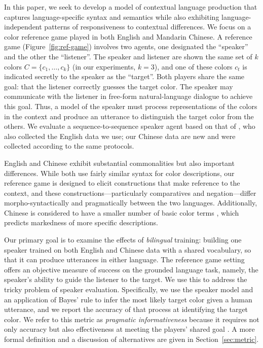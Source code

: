 \documentclass[11pt,a4paper]{article}
\renewcommand{\|}{\mid}
\newcommand{\figref}[1]{Figure~\ref{#1}}
\newcommand{\secref}[1]{Section~\ref{#1}}
\begin{document}
In this paper, we seek to develop a model of contextual language production that captures language-specific syntax and semantics while also exhibiting language-independent patterns of responsiveness to contextual differences. We focus on a color reference game \citep{Rosenberg:Cohen:1964,Dale:Reiter:1995,Krahmer:vanDeemter:2012}
played in both English and Mandarin Chinese.
A reference game (\figref{fig:ref-game}) involves two agents, one designated the ``speaker'' and the other the ``listener''. The
speaker and listener are shown the same set of $k$ colors $C = \{c_1, \dotsc, c_k\}$ (in our experiments, 
$k = 3$), and one of these
colors $c_t$ is indicated secretly to the speaker as the ``target''. Both players share the same goal:
that the listener correctly guesses the target color. The speaker may communicate with the listener in
free-form natural-language dialogue to achieve this goal. Thus, a model of the speaker must process representations of the colors in the context and produce an utterance to distinguish the target color from the others. We evaluate a sequence-to-sequence speaker agent based on that of \citet{Monroe2017}, who also collected the English data we use; our Chinese data are new and were collected according to the same protocols.

English and Chinese exhibit substantial commonalities but also important differences. While both use fairly similar syntax for color descriptions, our reference game is designed to elicit constructions that make reference to the context, and these constructions---particularly comparatives and negation---differ morpho-syntactically and pragmatically between the two languages. Additionally, Chinese is considered to have a smaller number of basic color terms \citep{BerlinKay1969}, which predicts markedness of more specific descriptions. %

Our primary goal is to examine the effects of \emph{bilingual} training: building one speaker trained on both English and Chinese data with a shared vocabulary, so that it can produce utterances in either language.  
The reference game setting offers an objective measure of success on the grounded
language task, namely, the speaker's ability to guide the listener to the target. We use this to address the tricky problem of speaker evaluation. Specifically, we use the speaker model and an application of Bayes' rule to infer the most likely target color given a human utterance, and we report the accuracy of that process at identifying the target color. We refer to this metric as \emph{pragmatic informativeness} because it requires not only accuracy but also effectiveness at meeting the players' shared goal \citep{Grice75}. 
%
A more formal definition and a discussion of alternatives are given in \secref{sec:metric}.
\end{document}
